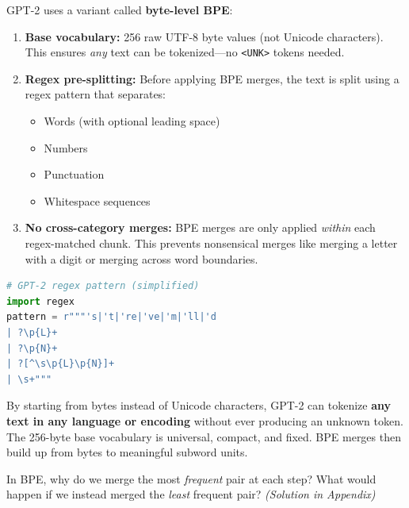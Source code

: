 \documentclass[11pt,a4paper]{article}
\begin{document}
GPT-2 uses a variant called \textbf{byte-level BPE}:

\begin{enumerate}[leftmargin=1.5em]
    \item \textbf{Base vocabulary:} 256 raw UTF-8 byte values (not Unicode characters). This ensures \emph{any} text can be tokenized---no \texttt{<UNK>} tokens needed.
    \item \textbf{Regex pre-splitting:} Before applying BPE merges, the text is split using a regex pattern that separates:
    \begin{itemize}[leftmargin=1em]
        \item Words (with optional leading space)
        \item Numbers
        \item Punctuation
        \item Whitespace sequences
    \end{itemize}
    \item \textbf{No cross-category merges:} BPE merges are only applied \emph{within} each regex-matched chunk. This prevents nonsensical merges like merging a letter with a digit or merging across word boundaries.
\end{enumerate}

\begin{lstlisting}[language=Python]
# GPT-2 regex pattern (simplified)
import regex
pattern = r"""'s|'t|'re|'ve|'m|'ll|'d
| ?\p{L}+
| ?\p{N}+
| ?[^\s\p{L}\p{N}]+
| \s+"""
\end{lstlisting}

\begin{tcolorbox}[intuitionbox={Why Byte-Level?}]
By starting from bytes instead of Unicode characters, GPT-2 can tokenize \textbf{any text in any language or encoding} without ever producing an unknown token. The 256-byte base vocabulary is universal, compact, and fixed. BPE merges then build up from bytes to meaningful subword units.
\end{tcolorbox}

\begin{tcolorbox}[questionbox={Self-Check Q5}]
In BPE, why do we merge the most \emph{frequent} pair at each step? What would happen if we instead merged the \emph{least} frequent pair? \textit{(Solution in Appendix)}
\end{tcolorbox}

\end{document}
